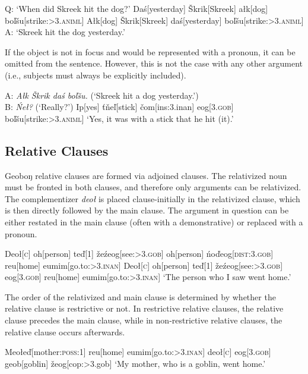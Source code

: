 \documentclass[10pt]{article}
\newcommand{\sk}{\textsc}
\newcommand{\vt}{ť}
\newcommand{\vd}{ď}
\newcommand{\vc}{č}
\newcommand{\vz}{ž}
\newcommand{\vs}{š}
\newcommand{\vl}{ľ}
\newcommand{\vn}{ň}
\newcommand{\vS}{Š}
\newcommand{\engma}{ŋ}
\begin{document}
\pex Q: `When did Skreek hit the dog?'
\a \ljudge*
\begingl
Da\'s[yesterday]
\vS krik[Skreek]
a\l k[dog]
bo\vl\vs u[strike:\sk{>3.animl}]
\endgl
\a 
\begingl
A\l k[dog]
\vS krik[Skreek] 
da\'s[yesterday]
bo\vl\vs u[strike:\sk{>3.animl}]
\glft A: `Skreek hit the dog yesterday.'
\endgl
\xe

If the object is not in focus and would be represented with a pronoun, it can be omitted from the sentence. However, this is not the case with any other argument (i.e., subjects must always be explicitly included).

\ex
\begingl
\glpreamble A: \textit{A\l k \vS krik da\'s bo\vl\vs u.} (`Skreek hit a dog yesterday.')\\B: \textit{\'Ne\l?} (`Really?')\endpreamble
Ip[yes]
\vt\vn e{\vl}[stick]
\vc om[\sc ins:3.inan]
eog[\sk{3.gob}]
bo\vl\vs u[strike:\sk{>3.animl}]
\glft `Yes, it was with a stick that he hit (it).'
\endgl
\xe

\subsection{Relative Clauses}

Geobo{\engma} relative clauses are formed via adjoined clauses. The relativized noun must be fronted in both clauses, and therefore only arguments can be relativized. The complementizer \textit{deo\l} is placed clause-initially in the relativized clause, which is then directly followed by the main clause. The argument in question can be either restated in the main clause (often with a demonstrative) or replaced with a pronoun.

\pex
\a
\begingl
Deo{\l}[\sk{c}]
oh[person]
te{\vd}[1]
\vz e\'zeog[see:\sk{>3.gob}]
\nogloss{,}
oh[person]
\'no\vd eog[\sk{dist:3.gob}]
reu[home]
eumim[go.to:\sk{>3.inan}]
\endgl
\a
\begingl
Deo{\l}[\sk{c}]
oh[person]
te{\vd}[1]
\vz e\'zeog[see:\sk{>3.gob}]
eog[\sk{3.gob}]
reu[home]
eumim[go.to:\sk{>3.inan}]
\glft `The person who I saw went home.'
\endgl
\xe

The order of the relativized and main clause is determined by whether the relative clause is restrictive or not. In restrictive relative clauses, the relative clause precedes the main clause, while in non-restrictive relative clauses, the relative clause occurs afterwards.

\ex
\begingl
Meo\l e\vd[mother:\sk{poss:1}]
reu[home]
eumim[go.to:\sk{>3.inan}]
\nogloss{,}
deo{\l}[\sk{c}]
eog[\sk{3.gob}]
geob[goblin]
\vz eog[\sc cop:>3.gob]
\glft `My mother, who is a goblin, went home.'
\endgl
\xe
\end{document}
